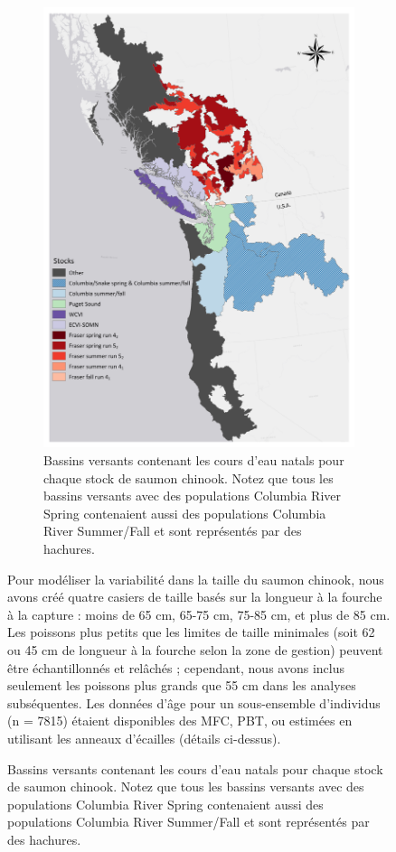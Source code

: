 \begin{figure}[H]
\begin{figure}[H]
    \centering
    \includegraphics[width=5in]{figs/chinook_stock_map.png}
    \caption{Bassins versants contenant les cours d'eau natals pour chaque stock de saumon chinook. Notez que tous les bassins versants avec des populations Columbia River Spring contenaient aussi des populations Columbia River Summer/Fall et sont représentés par des hachures.}
    \label{fig:stock-map}
\end{figure}

Pour modéliser la variabilité dans la taille du saumon chinook, nous avons créé quatre casiers de taille basés sur la longueur à la fourche à la capture : moins de 65 cm, 65-75 cm, 75-85 cm, et plus de 85 cm. Les poissons plus petits que les limites de taille minimales (soit 62 ou 45 cm de longueur à la fourche selon la zone de gestion) peuvent être échantillonnés et relâchés ; cependant, nous avons inclus seulement les poissons plus grands que 55 cm dans les analyses subséquentes. Les données d'âge pour un sous-ensemble d'individus (n = 7815) étaient disponibles des MFC, PBT, ou estimées en utilisant les anneaux d'écailles (détails ci-dessus).


\end{figure}
